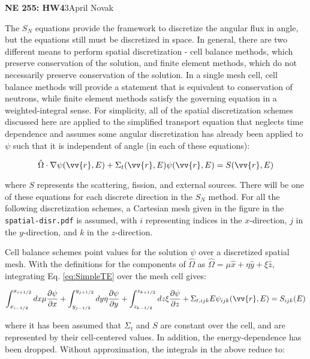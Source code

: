 \documentclass[10pt]{article}
\newcommand*\circled[1]{\tikz[baseline=(char.base)]{
            \node[shape=circle,draw,inner sep=2pt] (char) {#1};}}
\begin{document}
\textbf{NE 255: HW4}3\hfill April Novak\newline

\circled{1} The \(S_N\) equations provide the framework to discretize the angular flux in angle, but the equations still must be discretized in space. In general, there are two different means to perform spatial discretization - cell balance methods, which preserve conservation of the solution, and finite element methods, which do not necessarily preserve conservation of the solution. In a single mesh cell, cell balance methods will provide a statement that is equivalent to conservation of neutrons, while finite element methods satisfy the governing equation in a weighted-integral sense. For simplicity, all of the spatial discretization schemes discussed here are applied to the simplified transport equation that neglects time dependence and assumes some angular discretization has already been applied to \(\psi\) such that it is independent of angle (in each of these equations):

\begin{equation}
\label{eq:SimpleTE}
\hat{\Omega}\cdot\nabla\psi(\vv{r},E)+\Sigma_t({\vv{r},E})\psi(\vv{r},E)=S(\vv{r},E)
\end{equation}

where \(S\) represents the scattering, fission, and external sources. There will be one of these equations for each discrete direction in the \(S_N\) method. For all the following discretization schemes, a Cartesian mesh given in the figure in the \texttt{spatial-disr.pdf} is assumed, with \(i\) representing indices in the \(x\)-direction, \(j\) in the \(y\)-direction, and \(k\) in the \(z\)-direction.

Cell balance schemes point values for the solution \(\psi\) over a discretized spatial mesh. With the definitions for the components of \(\hat{\Omega}\) as \(\hat{\Omega}=\mu\hat{x}+\eta\hat{y}+\xi\hat{z}\), integrating Eq. \eqref{eq:SimpleTE} over the mesh cell gives:

\begin{equation}
\int_{x_{i-1/2}}^{x_{i+1/2}}dx\mu \frac{\partial \psi}{\partial x}+\int_{y_{j-1/2}}^{y_{j+1/2}}dy\eta \frac{\partial \psi}{\partial y}+\int_{z_{k-1/2}}^{z_{k+1/2}}dz\xi \frac{\partial \psi}{\partial z}+\Sigma_{t,ijk}{E}\psi_{ijk}(\vv{r},E)=S_{ijk}(E)
\end{equation}

where it has been assumed that \(\Sigma_t\) and \(S\) are constant over the cell, and are represented by their cell-centered values. In addition, the energy-dependence has been dropped. Without approximation, the integrals in the above reduce to:
\end{document}
